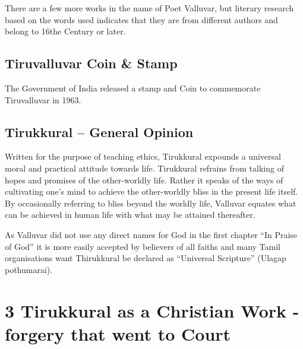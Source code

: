 There are a few more works in the name of Poet Valluvar, but literary research based on the words used indicates that they are from different authors and belong to 16the Century or later.


\subsection*{Tiruvalluvar Coin \& Stamp}

The Government of India released a stamp and Coin to commemorate Tiruvalluvar in 1963.


\subsection*{Tirukkural – General Opinion}

Written for the purpose of teaching ethics, Tirukkural expounds a universal moral and practical attitude towards life. Tirukkural refrains from talking of hopes and promises of the other-worldly life. Rather it speaks of the ways of cultivating one's mind to achieve the other-worldly bliss in the present life itself. By occasionally referring to bliss beyond the worldly life, Valluvar equates what can be achieved in human life with what may be attained thereafter.

As Valluvar did not use any direct names for God in the first chapter “In Praise of God” it is more easily accepted by believers of all faiths and many Tamil organisations want Thirukkural be declared as “Universal Scripture” (Ulagap pothumarai).


\section*{3 Tirukkural as a Christian Work - forgery that went to Court}

